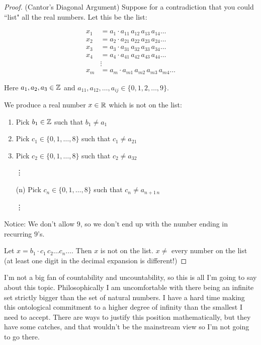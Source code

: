 \documentclass[10pt]{scrartcl}
\begin{document}
\begin{proof} (Cantor's Diagonal Argument)
Suppose for a contradiction that you could ``list" all the real numbers. Let this be the list: 

\[
\begin{aligned}
  x_1 &= a_1 \cdot a_{11}\,a_{12}\,a_{13}\,a_{14}\dots\\
  x_2 &= a_2 \cdot a_{21}\,a_{22}\,a_{23}\,a_{24}\dots\\
  x_3 &= a_3 \cdot a_{31}\,a_{32}\,a_{33}\,a_{34}\dots\\
  x_4 &= a_4 \cdot a_{41}\,a_{42}\,a_{43}\,a_{44}\dots\\
  &\vdots \\
  x_m &= a_m \cdot a_{m1}\,a_{m2}\,a_{m3}\,a_{m4}\dots 
\end{aligned}
\]

Here $a_1,a_2,a_3 \in\mathbb{Z}$ and $a_{11},a_{12},\dots,a_{ij} \in \{0,1,2,\dots,9\}$. 

We produce a real number $x \in\mathbb{R}$ which is not on the list:

\begin{enumerate}
\item Pick $b_1 \in\mathbb{Z}$ such that $b_1 \neq a_1$
\item Pick $c_1 \in \{0,1,\dots,8\}$ such that $c_1 \neq a_{21}$
\item Pick $c_2 \in \{0,1,\dots,8\}$ such that $c_2 \neq a_{32}$	

\hspace*{20pt} \vdots
\item[(n)] Pick $c_n \in \{0,1,\dots,8\}$ such that $c_n \neq a_{n+1\,n}$

\hspace*{20pt}\vdots 
\end{enumerate}

Notice: We don't allow $9$, so we don't end up with the number ending in recurring $9$'s.

Let $x = b_1\cdot c_1\,c_2\dots c_n \dots$. Then $x$ is not on the list. $x \neq$ every number on the list (at least one digit in the decimal expansion is different!)
\end{proof}\vspace*{10pt}

I'm not a big fan of countability and uncountability, so this is all I'm going to say about this topic. Philosophically I am uncomfortable with there being an infinite set strictly bigger than the set of natural numbers. I have a hard time making this ontological commitment to a higher degree of infinity than the smallest I need to accept. There are ways to justify this position mathematically, but they have some catches, and that wouldn't be the mainstream view so I'm not going to go there. 
\vspace*{2cm}
\end{document}
